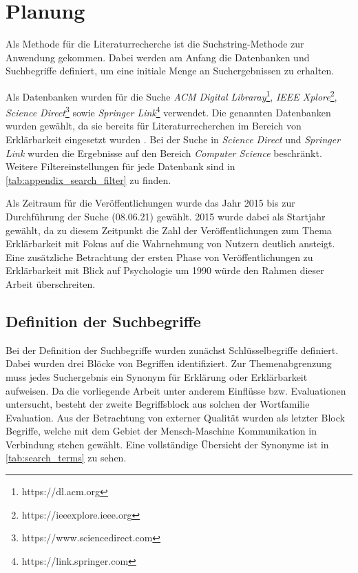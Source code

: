 \section{Planung}

Als Methode für die Literaturrecherche ist die Suchstring-Methode zur Anwendung gekommen. Dabei werden am Anfang die Datenbanken und Suchbegriffe definiert, um eine initiale Menge an Suchergebnissen zu erhalten.

Als Datenbanken wurden für die Suche \textit{ACM Digital Libraray}\footnote{https://dl.acm.org}, \textit{IEEE Xplore}\footnote{https://ieeexplore.ieee.org}, \textit{Science Direct}\footnote{https://www.sciencedirect.com} sowie \textit{Springer Link}\footnote{https://link.springer.com} verwendet. Die genannten Datenbanken wurden gewählt, da sie bereits für Literaturrecherchen im Bereich von Erklärbarkeit eingesetzt wurden \cite{nunes_systematic_2017, carvalho2017quality}. Bei der Suche in \textit{Science Direct} und \textit{Springer Link} wurden die Ergebnisse auf den Bereich \textit{Computer Science} beschränkt. Weitere Filtereinstellungen für jede Datenbank sind in \autoref{tab:appendix_search_filter} zu finden.

Als Zeitraum für die Veröffentlichungen wurde das Jahr 2015 bis zur Durchführung der Suche (08.06.21) gewählt. 2015 wurde dabei als Startjahr gewählt, da zu diesem Zeitpunkt die Zahl der Veröffentlichungen zum Thema Erklärbarkeit mit Fokus auf die Wahrnehmung von Nutzern deutlich ansteigt. Eine zusätzliche Betrachtung der ersten Phase von Veröffentlichungen zu Erklärbarkeit mit Blick auf Psychologie um 1990 würde den Rahmen dieser Arbeit überschreiten.

\subsection{Definition der Suchbegriffe}

Bei der Definition der Suchbegriffe wurden zunächst Schlüsselbegriffe definiert. Dabei wurden drei Blöcke von Begriffen identifiziert. Zur Themenabgrenzung muss jedes Suchergebnis ein Synonym für \glqq Erklärung\grqq{} oder \glqq Erklärbarkeit\grqq{} aufweisen. Da die vorliegende Arbeit unter anderem Einflüsse bzw. Evaluationen untersucht, besteht der zweite Begriffsblock aus solchen der Wortfamilie \glqq Evaluation\grqq{}. Aus der Betrachtung von externer Qualität wurden als letzter Block Begriffe, welche mit dem Gebiet der Mensch-Maschine Kommunikation in Verbindung stehen gewählt. Eine vollständige Übersicht der Synonyme ist in \autoref{tab:search_terms} zu sehen.

